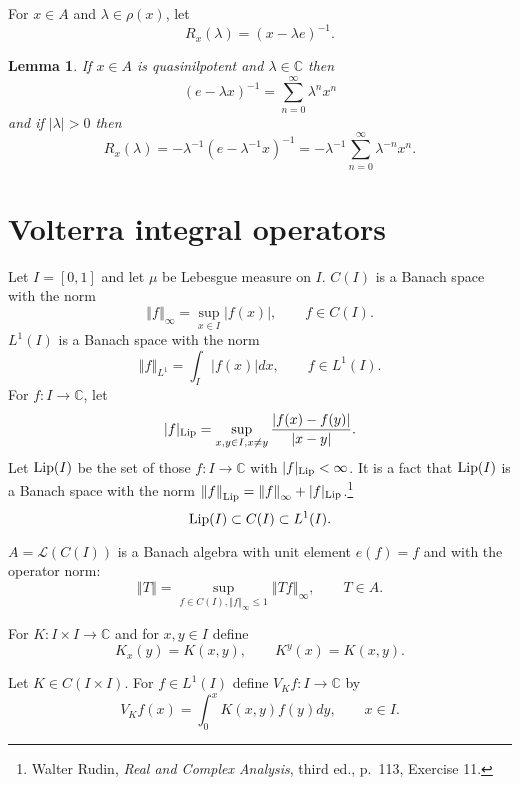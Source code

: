 \documentclass{article}
\newcommand{\Lip}{\ensuremath\mathrm{Lip}}
\newcommand{\norm}[1]{\left\Vert #1 \right\Vert}
\newtheorem{lemma}[theorem]{Lemma}
\theoremstyle{definition}
\begin{document}
For $x \in A$ and $\lambda \in \rho(x)$, let
\[
R_x(\lambda) = (x-\lambda e)^{-1}.
\]

\begin{lemma}
If $x \in A$ is quasinilpotent and $\lambda \in \mathbb{C}$ then
\[
(e-\lambda x)^{-1} = \sum_{n=0}^\infty \lambda^n x^n
\]
and if $|\lambda|>0$ then
\[
R_x(\lambda) = -\lambda^{-1}(e-\lambda^{-1}x)^{-1}
=-\lambda^{-1}\sum_{n=0}^\infty \lambda^{-n} x^n.
\]
\label{quasi}
\end{lemma}







\section{Volterra integral operators}
Let $I=[0,1]$ and let
$\mu$ be Lebesgue measure on $I$.
$C(I)$ is a Banach space with the
norm
\[
\norm{f}_\infty = \sup_{x \in I} |f(x)|,\qquad f \in C(I).
\]
$L^1(I)$ is a Banach space with the norm
\[
\norm{f}_{L^1} = \int_I |f(x)| dx,\qquad f \in L^1(I).
\]
For $f:I \to \mathbb{C}$,
let
\[
|f|_\Lip = \sup_{x,y \in I, x \neq y} \frac{|f(x)-f(y)|}{|x-y|}.
\]
Let $\Lip(I)$ be the set of those $f:I \to \mathbb{C}$ with $|f|_\Lip<\infty$. It is a fact that
$\Lip(I)$ is a Banach space with the norm $\norm{f}_\Lip=\norm{f}_\infty+|f|_\Lip$.\footnote{Walter Rudin,
{\em Real and Complex Analysis}, third ed., p.~113, Exercise 11.}
\[
\Lip(I) \subset C(I) \subset L^1(I).
\]

$A=\mathscr{L}(C(I))$ is a Banach algebra with unit element
$e(f)=f$ and 
 with the operator norm:
\[
\norm{T} = \sup_{f \in C(I), \norm{f}_\infty \leq 1} \norm{Tf}_\infty,
\qquad T \in A.
\]




For $K:I \times I \to \mathbb{C}$ and for $x,y \in I$ define
\[
K_x(y)=K(x,y),\qquad K^y(x)=K(x,y).
\]

Let
$K \in C(I \times I)$.
For $f \in L^1(I)$ define $V_Kf:I \to \mathbb{C}$ by
\[
V_Kf(x) = \int_0^x K(x,y) f(y) dy,
\qquad x \in I.
\]
\end{document}
